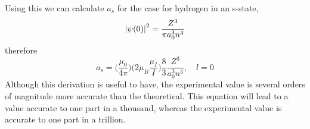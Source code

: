 Using this we can calculate \(a_s\) for the case for hydrogen in an s-state,
\begin{equation}
    \abs{\psi(0)}^2 = \frac{Z^3}{\pi a_0^3 n^3}
\end{equation}
therefore
\begin{equation}
    a_s = \bigg(\frac{\mu_0}{4\pi}\bigg)\bigg(2\mu_B \frac{\mu_I}{I}\bigg)
    \frac{8}{3}\frac{Z^3}{a_0^3 n^3},\quad l=0
\end{equation}
Although this derivation is useful to have, the experimental value is several orders of magnitude more accurate than the theoretical. This equation will lead to a value accurate to one part in a thousand, whereas the experimental value is accurate to one part in a trillion.

